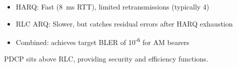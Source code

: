
\begin{itemize}
\tightlist
\item
  HARQ: Fast (8~ms RTT), limited retransmissions (typically 4)
\item
  RLC ARQ: Slower, but catches residual errors after HARQ exhaustion
\item
  Combined: achieves target BLER of 10\textsuperscript{-6} for AM bearers
\end{itemize}


PDCP sits above RLC, providing security and efficiency functions.


